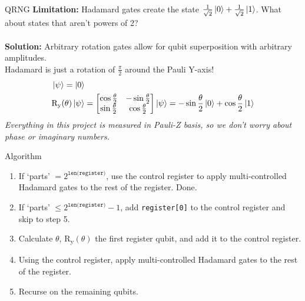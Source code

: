 \documentclass{beamer}
\begin{document}
  \begin{frame}{QRNG}
    \textbf{Limitation:} Hadamard gates create the state $ \frac{1}{\sqrt{2}} \ket{0} + \frac{1}{\sqrt{2}} \ket{1} $. What about states that aren't powers of 2? \\ \\
    \textbf{Solution:} Arbitrary rotation gates allow for qubit superposition with arbitrary amplitudes. \\
    Hadamard is just a rotation of $ \frac{\pi}{2} $ around the Pauli Y-axis!
    \begin{align*}
        &\ket{\psi} = \ket{0} \\
        & \text{R}_{\text{y}}(\theta) \ket{\psi} = \begin{bmatrix} \cos \frac{\theta}{2} & -\sin \frac{\theta}{2} \\ \sin \frac{\theta}{2} & \cos \frac{\theta}{2} \end{bmatrix} \ket{\psi} = -\sin \frac{\theta}{2} \ket{0} + \cos \frac{\theta}{2} \ket{1}
    \end{align*}
    \textit{Everything in this project is measured in Pauli-Z basis, so we don't worry about phase or imaginary numbers.}
  \end{frame}
  
  \begin{frame}{Algorithm}
  \begin{enumerate}
      \item If `parts' $= 2^\texttt{len(register)}$, use the control register to apply multi-controlled Hadamard gates to the rest of the register. Done.
      \item If `parts' $\leq 2^\texttt{len(register)}-1$, add \texttt{register[0]} to the control register and skip to step 5.
      \item Calculate $\theta$, R\textsubscript{y}$(\theta)$ the first register qubit, and add it to the control register.
      \item Using the control register, apply multi-controlled Hadamard gates to the rest of the register.
      \item Recurse on the remaining qubits. \\
  \end{enumerate}
  \end{frame}
  
\end{document}
